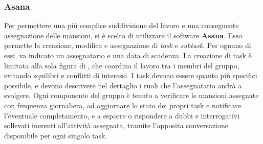 		\subsubsection{Asana}
		Per permettere una più semplice suddivisione del lavoro e una conseguente assegnazione delle mansioni, si è scelto di utilizzare il software \textbf{Asana}. Esso permette la creazione, modifica e assegnazione di \textit{task} e \textit{subtask}. Per ognuno di essi, va indicato un assegnatario e una data di scadenza. La creazione di task è limitata alla sola figura di \textit{\RdP}, che coordina il lavoro tra i membri del gruppo, evitando squilibri e conflitti di interessi. I task devono essere quanto più specifici possibile, e devono descrivere nel dettaglio i ruoli che l'assegnatario andrà a svolgere. Ogni componente del gruppo è tenuto a verificare le mansioni assegnate con frequenza giornaliera, ad aggiornare lo stato dei propri task e notificare l'eventuale completamento, e a esporre o rispondere a dubbi e interrogativi sollevati inerenti all'attività assegnata, tramite l'apposita conversazione disponibile per ogni singolo task.